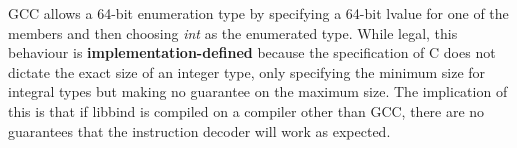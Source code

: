 GCC allows a 64-bit enumeration type by specifying a 64-bit lvalue for one of the members and then choosing \emph{int} as the enumerated type. While legal, this behaviour is \textbf{implementation-defined} because the specification of C does not dictate the exact size of an integer type, only specifying the minimum size for integral types but making no guarantee on the maximum size. The implication of this is that if libbind is compiled on a compiler other than GCC, there are no guarantees that the instruction decoder will work as expected.